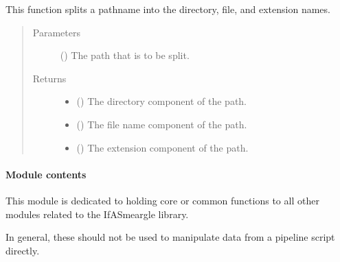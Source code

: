 \documentclass[letterpaper,10pt,english]{sphinxmanual}
\begin{document}
\begin{fulllineitems}
\label{\detokenize{docstrings/ifa_smeargle.core.string_formatting:ifa_smeargle.core.string_formatting.split_pathname}}
This function splits a pathname into the directory, file,
and extension names.
\begin{quote}\begin{description}
\item[{Parameters}] \leavevmode
{} () \textendash{} The path that is to be split.

\item[{Returns}] \leavevmode
\begin{itemize}
\item {} 
 () \textendash{} The directory component of the path.

\item {} 
 () \textendash{} The file name component of the path.

\item {} 
 () \textendash{} The extension component of the path.

\end{itemize}


\end{description}\end{quote}

\end{fulllineitems}



\paragraph{Module contents}
\label{\detokenize{docstrings/ifa_smeargle.core:module-ifa_smeargle.core}}\label{\detokenize{docstrings/ifa_smeargle.core:module-contents}}
This module is dedicated to holding core or common functions to all
other modules related to the IfA\sphinxhyphen{}Smeargle library.

In general, these should not be used to manipulate data from
a pipeline script directly.
\end{document}
